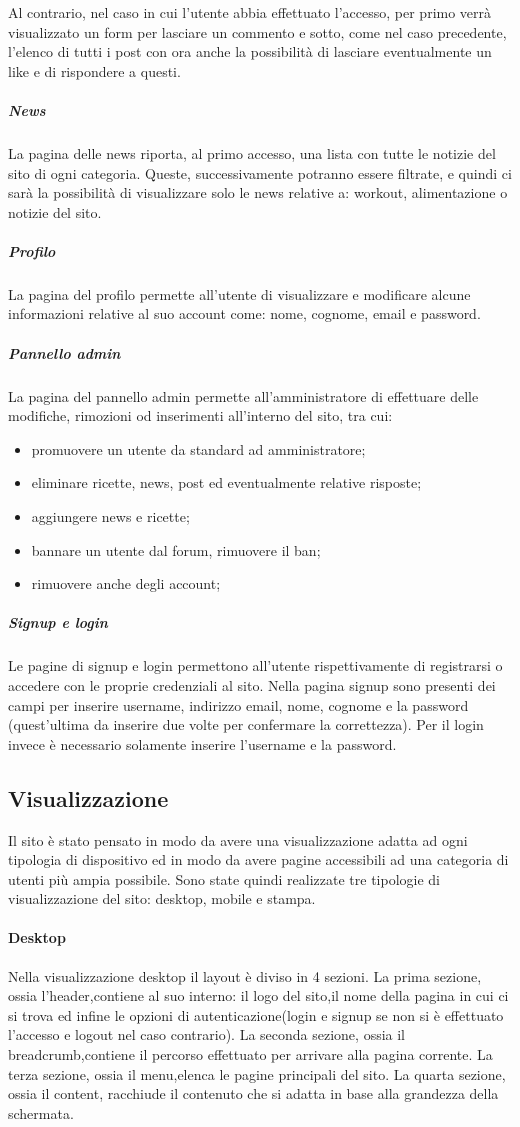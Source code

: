 Al contrario, nel caso in cui l'utente abbia effettuato l'accesso, per primo verrà visualizzato un form per lasciare un commento e sotto, come nel caso precedente, l'elenco di tutti i post con ora anche la possibilità di lasciare eventualmente un like e di rispondere a questi.
\subparagraph{News}
La pagina delle news riporta, al primo accesso, una lista con tutte le notizie del sito di ogni categoria. Queste, successivamente potranno essere filtrate, e quindi ci sarà la possibilità di visualizzare solo le news relative a: workout, alimentazione o notizie del sito.
\subparagraph{Profilo}
La pagina del profilo permette all'utente di visualizzare e modificare alcune informazioni relative al suo account come: nome, cognome, email e password.
\subparagraph{Pannello admin}
La pagina del pannello admin permette all'amministratore di effettuare delle modifiche, rimozioni od inserimenti all'interno del sito, tra cui: 
\begin{itemize}
	\item promuovere un utente da standard ad amministratore;
	\item eliminare ricette, news, post ed eventualmente relative risposte;
	\item aggiungere news e ricette;
	\item bannare un utente dal forum, rimuovere il ban;
	\item rimuovere anche degli account;
\end{itemize}     
\subparagraph{Signup e login}
Le pagine di signup e login permettono all'utente rispettivamente di  registrarsi o accedere con le proprie credenziali al sito. Nella pagina signup sono presenti dei campi per inserire username, indirizzo email, nome, cognome e la password (quest’ultima da inserire due volte per confermare la correttezza). Per il login invece è necessario solamente inserire l'username e la password.
\subsection{Visualizzazione}
Il sito è stato pensato in modo da avere una visualizzazione adatta ad ogni tipologia di dispositivo ed in modo da avere pagine accessibili ad una categoria di utenti più ampia possibile.
Sono state quindi realizzate tre tipologie di visualizzazione del sito: desktop, mobile e stampa.
\paragraph{Desktop}
Nella visualizzazione desktop il layout è diviso in 4 sezioni.
La prima sezione, ossia l'header,contiene al suo interno: il logo del sito,il nome della pagina in cui ci si trova ed infine le opzioni di autenticazione(login e signup se non si è effettuato l'accesso e logout nel caso contrario).
La seconda sezione, ossia il breadcrumb,contiene il percorso effettuato per arrivare alla pagina corrente.
La terza sezione, ossia il menu,elenca le pagine principali del sito.
La quarta sezione, ossia il content, racchiude il contenuto che si adatta in base alla grandezza della schermata.
